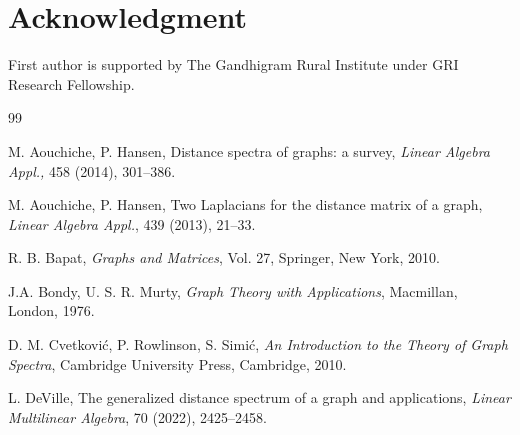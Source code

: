 \documentclass[12pt]{article}
\numberwithin{equation}{section}
\begin{document}
		\section*{Acknowledgment} First author is supported by The Gandhigram Rural Institute under GRI Research Fellowship. 
	
	\begin{thebibliography}{99}
	
			M. Aouchiche, P. Hansen, Distance spectra of graphs: a survey, \textit{Linear Algebra Appl.,} 458 (2014), 301–386.
		
		 M. Aouchiche, P. Hansen, Two Laplacians for the distance matrix of a graph, \textit{Linear Algebra Appl.},  439 (2013), 21--33.
		
		

	
		 R. B. Bapat, \textit{Graphs and Matrices}, Vol. 27, Springer, New York, 2010.
		
		J.A. Bondy, U. S. R. Murty,  \textit{Graph Theory with Applications},  Macmillan, London, 1976. 
		
		

		
	
		
		
	
		
		 D. M. Cvetkovi{\'c}, P. Rowlinson, S. Simi{\'c}, \textit{An Introduction to the Theory of Graph Spectra}, Cambridge University Press, Cambridge, 2010.
		
		 L. DeVille, The generalized distance spectrum of a graph and applications, \textit{Linear Multilinear Algebra},  70 (2022), 2425--2458.
		
		
	
	
		
	
		


\end{thebibliography}
\end{document}
